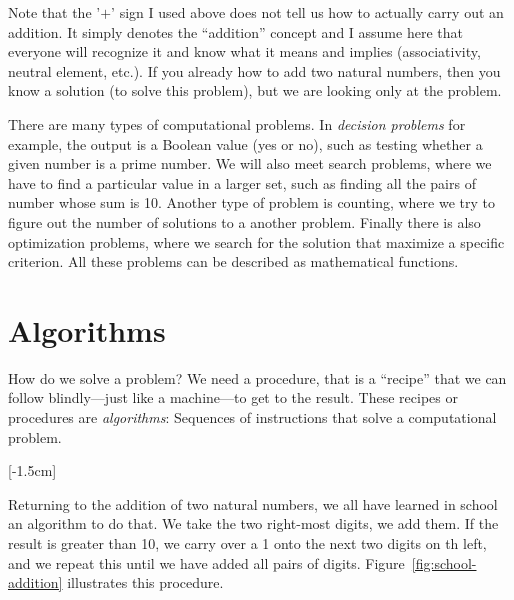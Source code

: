 \documentclass {aldast}
\begin{document}
Note that the '$+$' sign I used above does not tell us how to actually
carry out an addition. It simply denotes the ``addition'' concept and
I assume here that everyone will recognize it and know what it means
and implies (associativity, neutral element, etc.). If you already how
to add two natural numbers, then you know a solution (to solve this
problem), but we are looking only at the problem.

There are many types of computational problems. In \emph{decision
  problems} for example, the output is a Boolean value (yes or no),
such as testing whether a given number is a prime number. We will also
meet search problems, where we have to find a particular value in a
larger set, such as finding all the pairs of number whose sum is
10. Another type of problem is counting, where we try to figure out
the number of solutions to a another problem. Finally there is also
optimization problems, where we search for the solution that maximize
a specific criterion. All these problems can be described as
mathematical functions.


\section{Algorithms}

How do we solve a problem? We need a procedure, that is a ``recipe''
that we can follow blindly---just like a machine---to get to the
result. These recipes or procedures are \emph{algorithms}:
Sequences of instructions that solve a computational problem.

[-1.5cm]

Returning to the addition of two natural numbers, we all have learned
in school an algorithm to do that. We take the two right-most digits,
we add them. If the result is greater than 10, we carry over a 1 onto
the next two digits on th left, and we repeat this until we have added
all pairs of digits. Figure~\ref{fig:school-addition} illustrates this
procedure.
\end{document}
